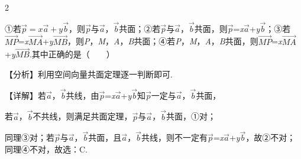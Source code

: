 \begin{multicols}{2}




\bindopt ①若\(\overrightarrow{p} = x\overrightarrow{a} + y\overrightarrow{b}\)，则\(\overrightarrow{p}\)与\(\overrightarrow{a}\)，\(\overrightarrow{b}\)共面；②若\(\overrightarrow{p}\)与\(\overrightarrow{a}\)，\(\overrightarrow{b}\)共面，则\(\overrightarrow{p}\)=\emph{x}\(\overrightarrow{a}\)+\emph{y}\(\overrightarrow{b}\)；③若\(\overrightarrow{MP}\)=\emph{x}\(\overrightarrow{MA}\)+\emph{y}\(\overrightarrow{MB}\)，则\emph{P}，\emph{M}，\emph{A}，\emph{B}共面；④若\emph{P}，\emph{M}，\emph{A}，\emph{B}共面，则\(\overrightarrow{MP}\)=\emph{x}\(\overrightarrow{MA}\)+\emph{y}\(\overrightarrow{MB}\).其中正确的是（~~~~）



\bindp 【分析】利用空间向量共面定理逐一判断即可.

\bindp 【详解】若\(\overrightarrow{a}\)，\(\overrightarrow{b}\)共线，由\(\overrightarrow{p}\)=\emph{x}\(\overrightarrow{a}\)+\emph{y}\(\overrightarrow{b}\)知\(\overrightarrow{p}\)一定与\(\overrightarrow{a}\)，\(\overrightarrow{b}\)共面，

\bindp 若\(\overrightarrow{a}\)，\(\overrightarrow{b}\)不共线，则满足共面定理，\(\overrightarrow{p}\)与\(\overrightarrow{a}\)，\(\overrightarrow{b}\)共面，①对；

\bindp 同理③对；若\(\overrightarrow{p}\)与\(\overrightarrow{a}\)，\(\overrightarrow{b}\)共面，且\(\overrightarrow{a}\)，\(\overrightarrow{b}\)共线，则不一定有\(\overrightarrow{p}\)=\emph{x}\(\overrightarrow{a}\)+\emph{y}\(\overrightarrow{b}\)，故②不对；同理④不对，故选：C.



\end{multicols}
